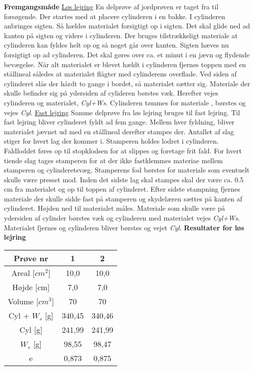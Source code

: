 \textbf{Fremgangsmåde}
\newline
\underline{Løs lejring}
\newline
En delprøve af jordprøven er taget fra til forsøgende. Der startes med at placere cylinderen i en bakke. I cylinderen anbringes sigten. Så hældes materialet forsigtigt  op i sigten. Det skal glide ned ad kanten på sigten og videre i cylinderen. Der bruges tilstrækkeligt materiale at cylinderen kan fyldes helt op og så noget går over kanten. Sigten hæves nu forsigtigt op ad cylinderen. Det skal gøres over ca. et minut  i en jævn og flydende bevægelse. Når alt materialet er blevet hældt i cylinderen fjernes toppen med en stållineal således at materialet flågter med cylinderens overflade. Ved siden af cylinderet slås der hårdt to gange i bordet, så materialet sætter sig. Materiale der skulle befinder sig på ydersiden af cylideren børstes væk. Herefter vejes cylinderen og materialet, \textit{Cyl+Ws}. Cylinderen tømmes for materiale , børstes og vejes \textit{Cyl}.
\newline
\newline
\underline{Fast lejring}
\newline
Samme delprøve fra løs lejring bruges til fast lejring. Til fast lejring bliver cylinderet fyldt ad fem gange. Mellem hver fyldning, bliver materialet jævnet ud med en stållineal derefter stampes der. Antallet af slag stiger for hvert lag der kommer i. Stamperen holdes lodret i cylinderen. Faldloddet føres op til stopklodsen for at slippes og foretage frit fald. For hvert tiende slag tages stamperen for at der ikke fastklemmes materiae mellem stamperen og cylinderetsvæg. Stamperens fod børstes for materiale som eventuelt skulle være presset mod. Inden det sidste lag skal stampes skal der være ca. 0.5 cm fra materialet og op til toppen af cylinderet. Efter sidste stampning fjernes materiale der skulle sidde fast på stamperen og skydelæren sættes på kanten af cylinderet. Højden ned til materialet måles. Materiale som skulle være på ydersiden af cylinder børstes væk og cylinderen med materialet vejes \textit{Cyl+Ws}. Materialet fjernes og cylinderen bliver børstes og vejet \textit{Cyl}.
\newline
\newline
\textbf{Resultater for løs lejring}
\begin{center}
	\begin{tabular}{ |c|c|c| } 
		\hline
		Prøve nr & 1 & 2 \\	\hline 
		Areal [$cm^2$] & 10,0 & 10,0 \\ \hline
		Højde [cm] & 7,0 & 7,0 \\ \hline
		Volume [$cm^3$] & 70 & 70 \\ \hline
		Cyl + $W_s$ [g] & 340,45 & 340,46 \\ \hline
		Cyl [g] & 241,99 & 241,99 \\ \hline
		$W_s$ [g] & 98,55 & 98,47 \\ \hline
		e & 0,873 & 0,875 \\ \hline
	\end{tabular}
\end{center}

